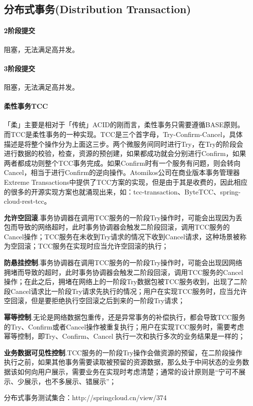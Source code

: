 \documentclass[../../../interview-questions.tex]{subfiles}
\begin{document}
\subsection{分布式事务(Distribution Transaction)}

\paragraph{2阶段提交}

阻塞，无法满足高并发。

\paragraph{3阶段提交}

阻塞，无法满足高并发。

\paragraph{柔性事务TCC}

「柔」主要是相对于「传统」ACID的刚而言，柔性事务只需要遵循BASE原则。而TCC是柔性事务的一种实现。TCC是三个首字母，Try-Confirm-Cancel，具体描述是将整个操作分为上面这三步。两个微服务间同时进行Try，在Try的阶段会进行数据的校验，检查，资源的预创建，如果都成功就会分别进行Confirm，如果两者都成功则整个TCC事务完成。如果Confirm时有一个服务有问题，则会转向Cancel，相当于进行Confirm的逆向操作。Atomikos公司在商业版本事务管理器Extreme Transactions中提供了TCC方案的实现，但是由于其是收费的，因此相应的很多的开源实现方案也就涌现出来，如：tcc-transaction、ByteTCC、spring-cloud-rest-tcc。

\textbf{允许空回滚}.事务协调器在调用TCC服务的一阶段Try操作时，可能会出现因为丢包而导致的网络超时，此时事务协调器会触发二阶段回滚，调用TCC服务的Cancel操作；TCC服务在未收到Try请求的情况下收到Cancel请求，这种场景被称为空回滚；TCC服务在实现时应当允许空回滚的执行；

\textbf{防悬挂控制}.事务协调器在调用TCC服务的一阶段Try操作时，可能会出现因网络拥堵而导致的超时，此时事务协调器会触发二阶段回滚，调用TCC服务的Cancel操作；在此之后，拥堵在网络上的一阶段Try数据包被TCC服务收到，出现了二阶段Cancel请求比一阶段Try请求先执行的情况；用户在实现TCC服务时，应当允许空回滚，但是要拒绝执行空回滚之后到来的一阶段Try请求；

\textbf{幂等控制}.无论是网络数据包重传，还是异常事务的补偿执行，都会导致TCC服务的Try、Confirm或者Cancel操作被重复执行；用户在实现TCC服务时，需要考虑幂等控制，即Try、Confirm、Cancel 执行一次和执行多次的业务结果是一样的；

\textbf{业务数据可见性控制}.TCC服务的一阶段Try操作会做资源的预留，在二阶段操作执行之前，如果其他事务需要读取被预留的资源数据，那么处于中间状态的业务数据该如何向用户展示，需要业务在实现时考虑清楚；通常的设计原则是“宁可不展示、少展示，也不多展示、错展示”；

分布式事务测试集合：http://springcloud.cn/view/374
\end{document}
